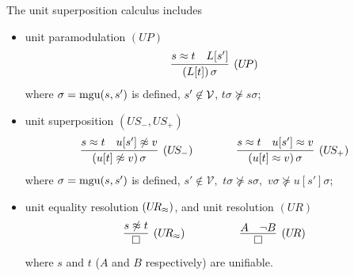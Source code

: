 \begin{definition}\label{def:unit-superpositin-calculus}
	The {\myem unit superposition calculus} includes 
	\begin{itemize}
		\item unit paramodulation $(U\!P)$
		\begin{gather*}
		\infer
		[(U\!P)]
		{(L[t])\,\sigma}
		{s\mEQ t&L[s']}
		\end{gather*}
		where $\sigma=\operatorname{mgu}(s,s')$ is defined,
		$s'\not\in{\mathcal V}$,
		$t\sigma\not\succcurlyeq s\sigma$;
		\item unit superposition $(U\!S_-,U\!S_+)$
		\begin{gather*}
		\infer
		[(U\!S_-)]
		{(u[t]\mNE v)\,\sigma}
		{s\mEQ t&u[s']\mNE v}
		\qquad\qquad
		\infer
		[(U\!S_+)]
		{(u[t]\mEQ v)\,\sigma}
		{s\mEQ t&u[s']\mEQ v}
		\end{gather*}
		where $\sigma=\operatorname{mgu}(s,s')$ is defined,
		$s'\not\in\mathcal{V},$
		$t\sigma\not\succcurlyeq s\sigma,$
		$v\sigma\not\succcurlyeq u[s']\sigma$;
		\item unit equality resolution $(U\!R_\approx)$, and unit resolution $(U\!R)$
		\begin{gather*}
		\infer
		[(U\!R_\mEQ)]
		{\emptyclause}
		{s\mNE t}
		\quad\quad\quad\qquad
		\infer
		[(U\!R)]
		{\emptyclause}
		{A&\lnot B}
		\end{gather*}
		where $s$ and $t$ ($A$ and $B$ respectively) are unifiable.
	\end{itemize}
\end{definition}
